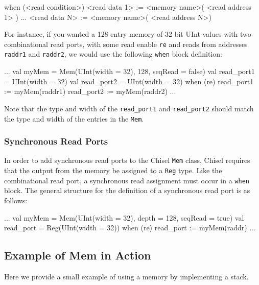 \begin{scala}
when (<read condition>) {
  <read data 1> := <memory name>( <read address 1> )
  ...
  <read data N> := <memory name>( <read address N>)
}
\end{scala}

For instance, if you wanted a 128 entry memory of 32 bit UInt values with two combinational read ports, with some read enable \verb+re+ and reads from addresses \verb+raddr1+ and \verb+raddr2+, we would use the following \verb+when+ block definition:

\begin{scala}
...
val myMem = Mem(UInt(width = 32), 128, seqRead = false)
val read_port1 = UInt(width = 32)
val read_port2 = UInt(width = 32)
when (re) {
  read_port1 := myMem(raddr1)
  read_port2 := myMem(raddr2)
}
...
\end{scala}

Note that the type and width of the \verb+read_port1+ and \verb+read_port2+ should match the type and width of the entries in the \verb+Mem+.

\subsubsection{Synchronous Read Ports}

In order to add synchronous read ports to the Chisel \verb+Mem+ class, Chisel requires that the output from the memory be assigned to a \verb+Reg+ type. Like the combinational read port, a synchronous read assignment must occur in a \verb+when+ block. The general structure for the definition of a synchronous read port is as follows:

\begin{scala}
...
val myMem = Mem(UInt(width = 32), depth = 128, seqRead = true)
val read_port = Reg(UInt(width = 32))
when (re) {
  read_port := myMem(raddr)
}
...
\end{scala}

\subsection{Example of Mem in Action}


Here we provide a small example of using a memory by implementing a stack.

